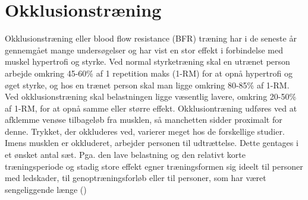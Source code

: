 \section{Okklusionstræning}
Okklusionstræning eller blood flow resistance (BFR) træning har i de seneste år gennemgået mange undersøgelser og har vist en stor effekt i forbindelse med muskel hypertrofi og styrke. Ved normal styrketræning skal en utrænet person arbejde omkring 45-60\% af 1 repetition maks (1-RM) for at opnå hypertrofi og øget styrke, og hos en trænet person skal man ligge omkring 80-85\% af 1-RM. Ved okklusionstræning skal belastningen ligge væsentlig lavere, omkring 20-50\% af 1-RM, for at opnå samme eller større effekt. 
Okklusiontræning udføres ved at afklemme venøse tilbageløb fra musklen, så manchetten sidder proximalt for denne. Trykket, der okkluderes ved, varierer meget hos de forskellige studier. Imens musklen er okkluderet, arbejder personen til udtrættelse. Dette gentages i et ønsket antal sæt. 
Pga. den lave belastning og den relativt korte træningsperiode og stadig store effekt egner træningsformen sig ideelt til personer med ledskader, til genoptræningsforløb eller til personer, som har været sengeliggende længe (\cite{RefWorks:38})









